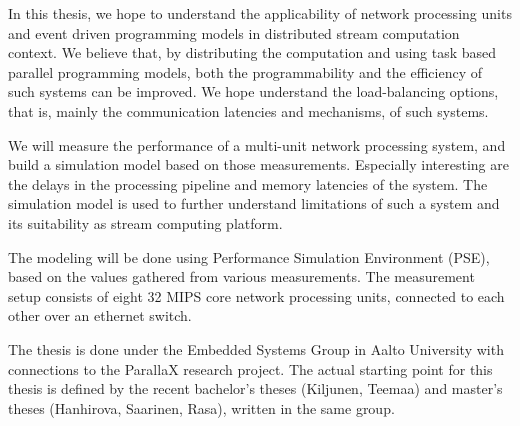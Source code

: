In this thesis, we hope to understand the applicability of network processing units and event driven programming models in distributed stream computation context. We believe that, by distributing the computation and using task based parallel programming models, both the programmability and the efficiency of such systems can be improved. We hope understand the load-balancing options, that is, mainly the communication latencies and mechanisms, of such systems.

We will measure the performance of a multi-unit network processing system, and build a simulation model based on those measurements. Especially interesting are the delays in the processing pipeline and memory latencies of the system. The simulation model is used to further understand limitations of such a system and its suitability as stream computing platform.

The modeling will be done using Performance Simulation Environment (PSE), based on the values gathered from various measurements. The measurement setup consists of eight 32 MIPS core network processing units, connected to each other over an ethernet switch.

The thesis is done under the Embedded Systems Group in Aalto University with connections to the ParallaX research project. The actual starting point for this thesis is defined by the recent bachelor's theses (Kiljunen, Teemaa) and master's theses (Hanhirova, Saarinen, Rasa), written in the same group.

